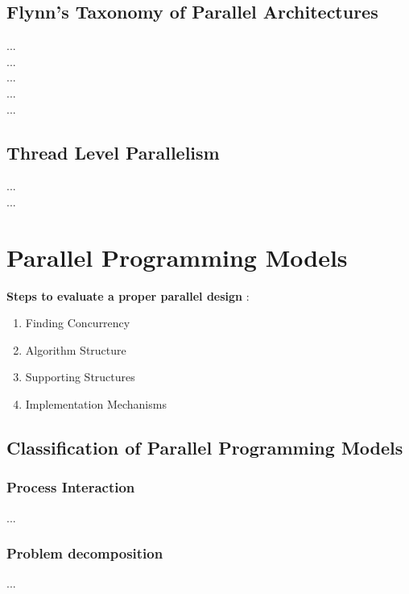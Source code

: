 \subsection{Flynn's Taxonomy of Parallel Architectures}

...\parencite[see][p5]{internet1}\\
...\parencite[see][p13]{book1}\\
...\parencite[see][p4]{book5}\\
...\parencite[see][p2]{book6}\\
...\parencite[see][p15-p26]{internet2}

\subsection{Thread Level Parallelism}\label{subchap:threadLevelParallelism}

...\parencite[see][p24]{book1}\\
...\parencite[see][p14]{article6}

\section{Parallel Programming Models}

\textbf{Steps to evaluate a proper parallel design} \parencite[see][p6]{article6}:
\begin{enumerate}
	\item Finding Concurrency
	\item Algorithm Structure
	\item Supporting Structures
	\item Implementation Mechanisms
\end{enumerate}

\newpage

\subsection{Classification of Parallel Programming Models}

\subsubsection{Process Interaction}

...\parencite[see][p4]{internet1}

\subsubsection{Problem decomposition}

...\parencite[see][p105 ff.]{book1}